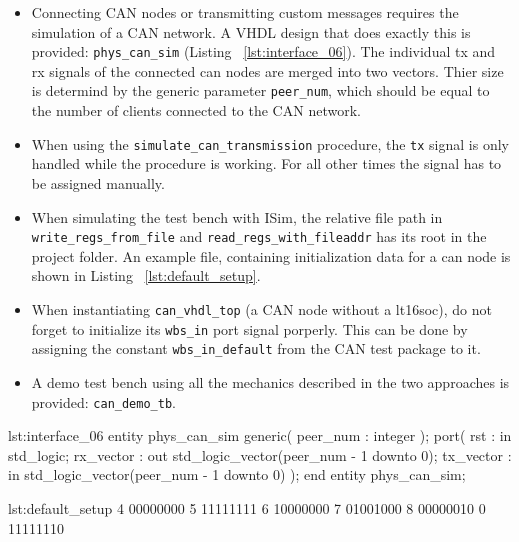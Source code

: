 \begin{itemize}
\item Connecting CAN nodes or transmitting custom messages requires the simulation of a CAN network. A VHDL design that does exactly this is provided: \verb=phys_can_sim= (Listing ~\ref{lst:interface_06}). The individual tx and rx signals of the connected can nodes are merged into two vectors. Thier size is determind by the generic parameter \verb=peer_num=, which should be equal to the number of clients connected to the CAN network.
\item When using the \verb=simulate_can_transmission= procedure, the \verb=tx= signal is only handled while the procedure is working. For all other times the signal has to be assigned manually.
\item When simulating the test bench with ISim, the relative file path in \verb=write_regs_from_file= and \verb=read_regs_with_fileaddr= has its root in the project folder. An example file, containing initialization data for a can node is shown in Listing ~\ref{lst:default_setup}.
\item When instantiating \verb=can_vhdl_top= (a CAN node without a lt16soc), do not forget to initialize its \verb=wbs_in= port signal porperly. This can be done by assigning the constant \verb=wbs_in_default= from the CAN test package to it.
\item A demo test bench using all the mechanics described in the two approaches is provided: \verb=can_demo_tb=.
\end{itemize}


\begin{vhdl}[Interface]{lst:interface_06}
entity phys_can_sim 
		generic(
			peer_num : integer );
		port(
			rst : in std_logic;
			rx_vector : out std_logic_vector(peer_num - 1 downto 0);
			tx_vector : in std_logic_vector(peer_num - 1 downto 0) );
end entity phys_can_sim;
\end{vhdl}



\begin{vhdl}{lst:default_setup}
4 00000000
5 11111111
6 10000000
7 01001000
8 00000010
0 11111110
\end{vhdl}

